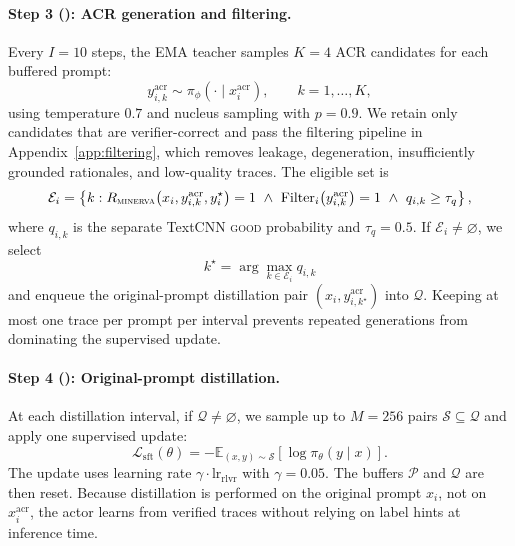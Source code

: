 \paragraph{Step 3 (): ACR generation and filtering.}
Every $I=10$ steps, the EMA teacher samples $K=4$ ACR candidates for each buffered prompt:
\begin{equation}
    y_{i,k}^{\mathrm{acr}}
    \sim
    \pi_\phi(\cdot\mid x_i^{\mathrm{acr}}),
    \qquad k=1,\ldots,K ,
\end{equation}
using temperature $0.7$ and nucleus sampling with $p=0.9$. We retain only candidates that are verifier-correct and pass the filtering pipeline in Appendix~\ref{app:filtering}, which removes leakage, degeneration, insufficiently grounded rationales, and low-quality traces. The eligible set is
\begin{equation}
    \mathcal{E}_i
    =
    \left\{
    k :
    R_{\textsc{minerva}}\!\left(x_i,y_{i,k}^{\mathrm{acr}},y_i^\star\right)=1
    \ \wedge\
    \mathrm{Filter}_i\!\left(y_{i,k}^{\mathrm{acr}}\right)=1
    \ \wedge\
    q_{i,k}\ge\tau_q
    \right\},
\end{equation}
where $q_{i,k}$ is the separate TextCNN \textsc{good} probability and $\tau_q=0.5$. If $\mathcal{E}_i\neq\varnothing$, we select
\begin{equation}
    k^\star=\arg\max_{k\in\mathcal{E}_i} q_{i,k}
\end{equation}
and enqueue the original-prompt distillation pair $(x_i,y_{i,k^\star}^{\mathrm{acr}})$ into $\mathcal{Q}$. Keeping at most one trace per prompt per interval prevents repeated generations from dominating the supervised update.

\paragraph{Step 4 (\Cref{alg:minervarl}): Original-prompt distillation.}
At each distillation interval, if $\mathcal{Q}\neq\varnothing$, we sample up to $M=256$ pairs $\mathcal{S}\subseteq\mathcal{Q}$ and apply one supervised update:
\begin{equation}
    \mathcal{L}_{\mathrm{sft}}(\theta)
    =
    -
    \mathbb{E}_{(x,y)\sim\mathcal{S}}
    \left[
    \log \pi_\theta(y\mid x)
    \right].
\end{equation}
The update uses learning rate $\gamma\cdot\mathrm{lr}_{\mathrm{rlvr}}$ with $\gamma=0.05$. The buffers $\mathcal{P}$ and $\mathcal{Q}$ are then reset. Because distillation is performed on the original prompt $x_i$, not on $x_i^{\mathrm{acr}}$, the actor learns from verified traces without relying on label hints at inference time.
